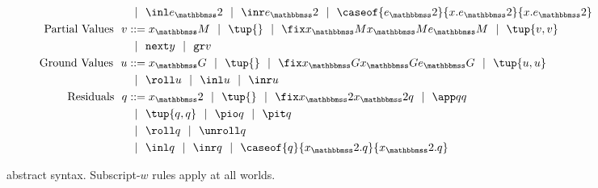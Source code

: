 \begin{figure}
\begin{abstrsyn}
\[\begin{aligned}
&\gbar \inl \exprT \gbar \inr \exprT
 \gbar \caseof {\exprT}{\var.\exprT}{\var.\exprT} \\ 
\text{Partial Values}\ \ 
v &::= \varM
 \gbar\tup{}
 \gbar \fix \varM \varM \exprM
 \gbar \tup{v, v} \\
&\gbar \next y
 \gbar \pure v \\
\text{Ground Values}\ \ 
u &::= \varG
 \gbar\tup{}
 \gbar \fix \varG \varG \exprG
 \gbar \tup{u, u} \\
&\gbar \roll u
 \gbar \inl u 
 \gbar \inr u \\
\text{Residuals}\ \ 
q &::= \varT
 \gbar \tup{}
 \gbar \fix \varT \varT q
 \gbar \app q q \\
&\gbar \tup{q, q} 
 \gbar \pio q 
 \gbar \pit q \\
&\gbar \roll q
 \gbar \unroll q\\
&\gbar \inl q 
 \gbar \inr q
 \gbar \caseof {q}{\varT.q}{\varT.q} \\
\end{aligned}\]
\end{abstrsyn}
\caption{\lang\ abstract syntax. Subscript-$w$ rules apply at all worlds.}
\label{fig:grammar}
\end{figure}
